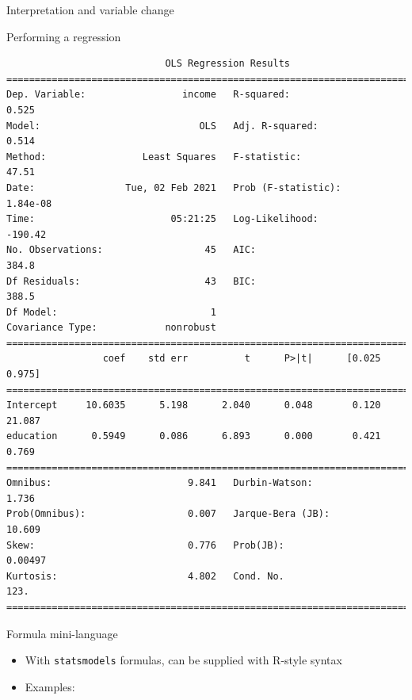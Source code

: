 \documentclass[
  ignorenonframetext,
  aspectratio=169,
]{beamer}
\providecommand{\tightlist}{%
  \setlength{\itemsep}{0pt}\setlength{\parskip}{0pt}}\usepackage{longtable,booktabs,array}
\begin{document}
\begin{frame}[fragile]{Interpretation and variable change}
\begin{block}{Performing a regression}
\begin{verbatim}
                            OLS Regression Results                            
==============================================================================
Dep. Variable:                 income   R-squared:                       0.525
Model:                            OLS   Adj. R-squared:                  0.514
Method:                 Least Squares   F-statistic:                     47.51
Date:                Tue, 02 Feb 2021   Prob (F-statistic):           1.84e-08
Time:                        05:21:25   Log-Likelihood:                -190.42
No. Observations:                  45   AIC:                             384.8
Df Residuals:                      43   BIC:                             388.5
Df Model:                           1                                         
Covariance Type:            nonrobust                                         
==============================================================================
                 coef    std err          t      P>|t|      [0.025      0.975]
==============================================================================
Intercept     10.6035      5.198      2.040      0.048       0.120      21.087
education      0.5949      0.086      6.893      0.000       0.421       0.769
==============================================================================
Omnibus:                        9.841   Durbin-Watson:                   1.736
Prob(Omnibus):                  0.007   Jarque-Bera (JB):               10.609
Skew:                           0.776   Prob(JB):                      0.00497
Kurtosis:                       4.802   Cond. No.                         123.
==============================================================================
\end{verbatim}
\end{block}

\begin{block}{Formula mini-language}
\protect\hypertarget{formula-mini-language}{}
\begin{itemize}
\tightlist
\item
  With \texttt{statsmodels} formulas, can be supplied with R-style
  syntax
\item
  Examples:
\end{itemize}


\end{block}
\end{frame}
\end{document}

